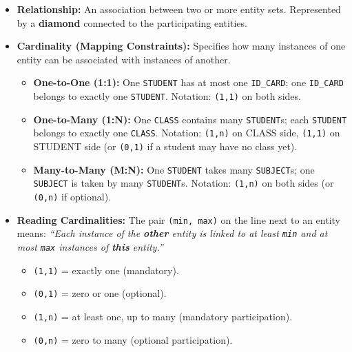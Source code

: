 \documentclass[11pt]{article}
\begin{document}
\begin{definition}
\begin{itemize}
    \item \textbf{Relationship:} An association between two or more entity sets. Represented by a \textbf{diamond} connected to the participating entities.
    \item \textbf{Cardinality (Mapping Constraints):} Specifies how many instances of one entity can be associated with instances of another.
    \begin{itemize}
        \item \textbf{One-to-One (1:1):} One \texttt{STUDENT} has at most one \texttt{ID\_CARD}; one \texttt{ID\_CARD} belongs to exactly one \texttt{STUDENT}. Notation: \texttt{(1,1)} on both sides.
        \item \textbf{One-to-Many (1:N):} One \texttt{CLASS} contains many \texttt{STUDENT}s; each \texttt{STUDENT} belongs to exactly one \texttt{CLASS}. Notation: \texttt{(1,n)} on CLASS side, \texttt{(1,1)} on STUDENT side (or \texttt{(0,1)} if a student may have no class yet).
        \item \textbf{Many-to-Many (M:N):} One \texttt{STUDENT} takes many \texttt{SUBJECT}s; one \texttt{SUBJECT} is taken by many \texttt{STUDENT}s. Notation: \texttt{(1,n)} on both sides (or \texttt{(0,n)} if optional).
    \end{itemize}
    \item \textbf{Reading Cardinalities:} The pair \texttt{(min, max)} on the line next to an entity means: \emph{``Each instance of the \textbf{other} entity is linked to at least \texttt{min} and at most \texttt{max} instances of \textbf{this} entity.''}
    \begin{itemize}
        \item \texttt{(1,1)} = exactly one (mandatory).
        \item \texttt{(0,1)} = zero or one (optional).
        \item \texttt{(1,n)} = at least one, up to many (mandatory participation).
        \item \texttt{(0,n)} = zero to many (optional participation).
    \end{itemize}
\end{itemize}
\end{definition}
\end{document}
